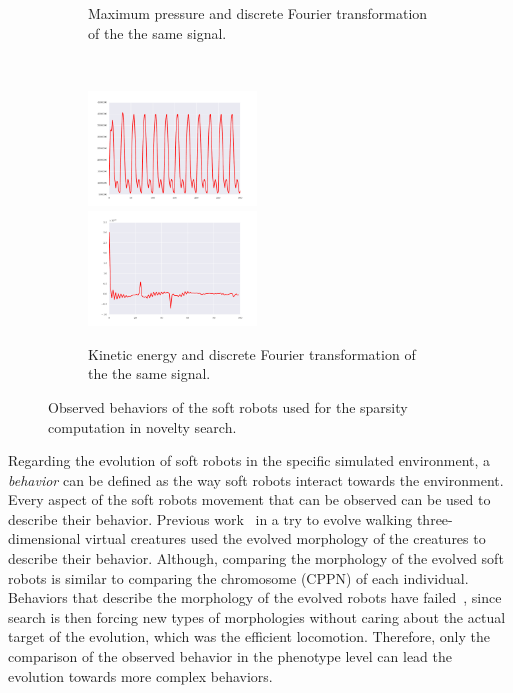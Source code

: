 \documentclass{sig-alternate}
\begin{document}
\begin{figure}[t!]
\begin{subfigure}[b]{0.25\textwidth}
\caption{Maximum pressure and discrete Fourier transformation of the the same signal.}
\end{subfigure}~
\begin{subfigure}[b]{0.25\textwidth}
\centering
\includegraphics[width=0.49\textwidth]{../Figures/Behaviors/ke.pdf}~
\includegraphics[width=0.49\textwidth]{../Figures/Behaviors/kedft.pdf}
\caption{Kinetic energy and discrete Fourier transformation of the the same signal.}
\end{subfigure}
\caption{Observed behaviors of the soft robots used for the sparsity computation in novelty search.}
\label{fig:Behaviors}
\end{figure}

Regarding the evolution of soft robots in the specific simulated environment, a \emph{behavior} can be defined as the way soft robots interact towards the environment. Every aspect of the soft robots movement that can be observed can be used to describe their behavior. Previous work~\cite{lehman2011evolving} in a try to evolve walking three-dimensional virtual creatures used the evolved morphology of the creatures to describe their behavior. Although, comparing the morphology of the evolved soft robots is similar to comparing the chromosome (CPPN) of each individual. Behaviors that describe the morphology of the evolved robots have failed~\cite{lehman2011evolving}, since search is then forcing new types of morphologies without caring about the actual target of the evolution, which was the efficient locomotion. Therefore, only the comparison of the observed behavior in the phenotype level can lead the evolution towards more complex behaviors. 
\end{document}

